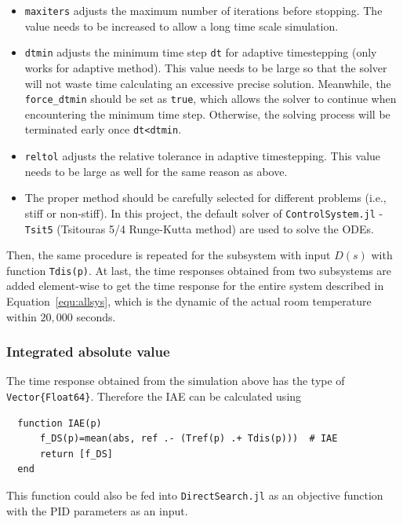 \documentclass[11pt,oneside,onecolumn,openright]{article}
\begin{document}
  \begin{itemize}
    \item \verb|maxiters| adjusts the maximum number of iterations before stopping. The value needs to be increased to allow a long time scale simulation.
    \item \verb|dtmin| adjusts the minimum time step \verb|dt| for adaptive timestepping (only works for adaptive method). This value needs to be large so that the solver will not waste time calculating an excessive precise solution. Meanwhile, the \verb|force_dtmin| should be set as \verb|true|, which allows the solver to continue when encountering the minimum time step. Otherwise, the solving process will be terminated early once \verb|dt<dtmin|.
    \item \verb|reltol| adjusts the relative tolerance in adaptive timestepping. This value needs to be large as well for the same reason as above.
    \item The proper method should be carefully selected for different problems (i.e., stiff or non-stiff). In this project, the default solver of \verb|ControlSystem.jl| - \verb|Tsit5| (Tsitouras 5/4 Runge-Kutta method) are used to solve the ODEs. 
  \end{itemize}

  Then, the same procedure is repeated for the subsystem with input $D(s)$ with function \verb|Tdis(p)|. At last, the time responses obtained from two subsystems are added element-wise to get the time response for the entire system described in Equation~\eqref{equ:allsys}, which is the dynamic of the actual room temperature within $20,000$ seconds.

  \subsubsection*{Integrated absolute value}
  The time response obtained from the simulation above has the type of \verb|Vector{Float64}|. Therefore the IAE can be calculated using 
  \begin{verbatim}
  function IAE(p)
      f_DS(p)=mean(abs, ref .- (Tref(p) .+ Tdis(p)))  # IAE
      return [f_DS]
  end
    \end{verbatim}
  This function could also be fed into \verb|DirectSearch.jl| as an objective function with the PID parameters as an input.
\end{document}
